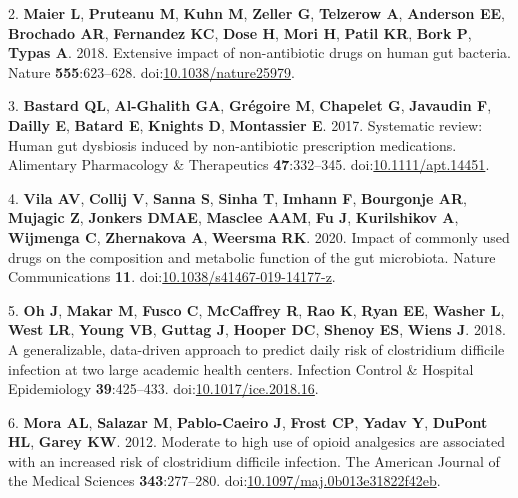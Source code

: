 \documentclass[
  11pt,
]{article}
\begin{document}
\leavevmode\hypertarget{ref-Maier2018}{}%
2. \textbf{Maier L}, \textbf{Pruteanu M}, \textbf{Kuhn M},
\textbf{Zeller G}, \textbf{Telzerow A}, \textbf{Anderson EE},
\textbf{Brochado AR}, \textbf{Fernandez KC}, \textbf{Dose H},
\textbf{Mori H}, \textbf{Patil KR}, \textbf{Bork P}, \textbf{Typas A}.
2018. Extensive impact of non-antibiotic drugs on human gut bacteria.
Nature \textbf{555}:623--628.
doi:\href{https://doi.org/10.1038/nature25979}{10.1038/nature25979}.

\leavevmode\hypertarget{ref-LeBastard2017}{}%
3. \textbf{Bastard QL}, \textbf{Al-Ghalith GA}, \textbf{Grégoire M},
\textbf{Chapelet G}, \textbf{Javaudin F}, \textbf{Dailly E},
\textbf{Batard E}, \textbf{Knights D}, \textbf{Montassier E}. 2017.
Systematic review: Human gut dysbiosis induced by non-antibiotic
prescription medications. Alimentary Pharmacology \& Therapeutics
\textbf{47}:332--345.
doi:\href{https://doi.org/10.1111/apt.14451}{10.1111/apt.14451}.

\leavevmode\hypertarget{ref-VichVila2020}{}%
4. \textbf{Vila AV}, \textbf{Collij V}, \textbf{Sanna S}, \textbf{Sinha
T}, \textbf{Imhann F}, \textbf{Bourgonje AR}, \textbf{Mujagic Z},
\textbf{Jonkers DMAE}, \textbf{Masclee AAM}, \textbf{Fu J},
\textbf{Kurilshikov A}, \textbf{Wijmenga C}, \textbf{Zhernakova A},
\textbf{Weersma RK}. 2020. Impact of commonly used drugs on the
composition and metabolic function of the gut microbiota. Nature
Communications \textbf{11}.
doi:\href{https://doi.org/10.1038/s41467-019-14177-z}{10.1038/s41467-019-14177-z}.

\leavevmode\hypertarget{ref-Oh2018}{}%
5. \textbf{Oh J}, \textbf{Makar M}, \textbf{Fusco C}, \textbf{McCaffrey
R}, \textbf{Rao K}, \textbf{Ryan EE}, \textbf{Washer L}, \textbf{West
LR}, \textbf{Young VB}, \textbf{Guttag J}, \textbf{Hooper DC},
\textbf{Shenoy ES}, \textbf{Wiens J}. 2018. A generalizable, data-driven
approach to predict daily risk of clostridium difficile infection at two
large academic health centers. Infection Control \& Hospital
Epidemiology \textbf{39}:425--433.
doi:\href{https://doi.org/10.1017/ice.2018.16}{10.1017/ice.2018.16}.

\leavevmode\hypertarget{ref-Mora2012}{}%
6. \textbf{Mora AL}, \textbf{Salazar M}, \textbf{Pablo-Caeiro J},
\textbf{Frost CP}, \textbf{Yadav Y}, \textbf{DuPont HL}, \textbf{Garey
KW}. 2012. Moderate to high use of opioid analgesics are associated with
an increased risk of clostridium difficile infection. The American
Journal of the Medical Sciences \textbf{343}:277--280.
doi:\href{https://doi.org/10.1097/maj.0b013e31822f42eb}{10.1097/maj.0b013e31822f42eb}.
\end{document}
